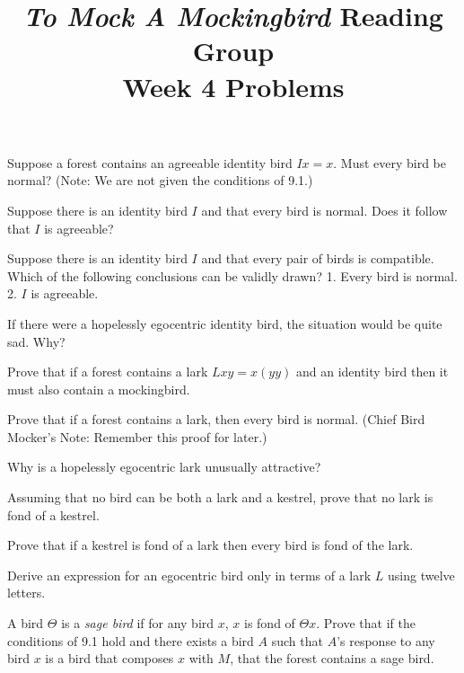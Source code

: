 \documentclass[12pt, letterpaper]{article}
\title{\emph{To Mock A Mockingbird} Reading Group\\Week 4 Problems}
\begin{document}
\maketitle

\disclaimer

\begin{prob}{9.20}
Suppose a forest contains an agreeable identity bird $Ix = x$. Must every bird be normal? (Note: We are not given the conditions of 9.1.)
\end{prob}

\begin{prob}{9.21}
Suppose there is an identity bird $I$ and that every bird is normal. Does it follow that $I$ is agreeable?
\end{prob}

\begin{prob}{9.22}
Suppose there is an identity bird $I$ and that every pair of birds is compatible. Which of the following conclusions can be validly drawn? 1. Every bird is normal. 2. $I$ is agreeable.
\end{prob}

\begin{prob}{9.23}
If there were a hopelessly egocentric identity bird, the situation would be quite sad. Why?
\end{prob}

\begin{prob}{9.24}
Prove that if a forest contains a lark $Lxy = x(yy)$ and an identity bird then it must also contain a mockingbird.
\end{prob}

\begin{prob}{9.25}
Prove that if a forest contains a lark, then every bird is normal. (Chief Bird Mocker's Note: Remember this proof for later.)
\end{prob}

\begin{prob}{9.26}
Why is a hopelessly egocentric lark unusually attractive?
\end{prob}

\begin{prob}{9.27}
Assuming that no bird can be both a lark and a kestrel, prove that no lark is fond of a kestrel.
\end{prob}

\begin{prob}{9.28}
Prove that if a kestrel is fond of a lark then every bird is fond of the lark.
\end{prob}

\begin{prob}{9.29}
Derive an expression for an egocentric bird only in terms of a lark $L$ using twelve letters.
\end{prob}

\begin{prob}{10.1}
A bird $\Theta$ is a \emph{sage bird} if for any bird $x$, $x$ is fond of $\Theta x$. Prove that if the conditions of 9.1 hold and there exists a bird $A$ such that $A$'s response to any bird $x$ is a bird that composes $x$ with $M$, that the forest contains a sage bird.
\end{prob}
\end{document}
